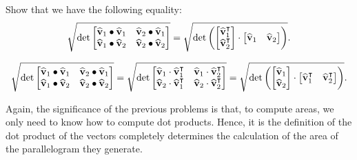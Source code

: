 \documentclass[newpage,hints,handout,nooutcomes,noauthor,12pt]{ximera}
\begin{document}
\begin{problem}
Show that we have the following equality:
\[
\sqrt{
  \det
\begin{bmatrix}
\hat{\mathbf v}_{1}\bullet\hat{\mathbf v}_{1} & \hat{\mathbf v}_{2}\bullet\hat{\mathbf v}_{1}\\
\hat{\mathbf v}_{1}\bullet\hat{\mathbf v}_{2} & \hat{\mathbf v}_{2}\bullet\hat{\mathbf v}_{2}%
\end{bmatrix}}
=
\sqrt{
  \det\left(
\begin{bmatrix}
\hat{\mathbf v}_{1}^\transpose \\
\hat{\mathbf v}_{2}^\transpose
\end{bmatrix}
\cdot
\begin{bmatrix}
\hat{\mathbf v}_{1}  & \hat{\mathbf v}_{2} 
\end{bmatrix}\right)}.
\]

\begin{freeResponse}
\[
\sqrt{
  \det
\begin{bmatrix}
\hat{\mathbf v}_{1}\bullet\hat{\mathbf v}_{1} & \hat{\mathbf v}_{2}\bullet\hat{\mathbf v}_{1}\\
\hat{\mathbf v}_{1}\bullet\hat{\mathbf v}_{2} & \hat{\mathbf v}_{2}\bullet\hat{\mathbf v}_{2}%
\end{bmatrix}}
=\sqrt{
  \det
\begin{bmatrix}
\hat{\mathbf v}_{1}\cdot \hat{\mathbf v}_{1}^\transpose & \hat{\mathbf v}_{1}\cdot \hat{\mathbf v}_{2}^\transpose\\
\hat{\mathbf v}_{2}\cdot \hat{\mathbf v}_{1}^\transpose & \hat{\mathbf v}_{2}\cdot \hat{\mathbf v}_{2}^\transpose%
\end{bmatrix}}
=\sqrt{
  \det\left(
\begin{bmatrix}
\hat{\mathbf v}_{1} \\
\hat{\mathbf v}_{2}
\end{bmatrix}
\cdot
\begin{bmatrix}
\hat{\mathbf v}_{1}^\transpose  & \hat{\mathbf v}_{2}^\transpose 
\end{bmatrix}\right)}.
\]
\end{freeResponse}
\end{problem}

Again, the significance of the previous problems is that, to compute
areas, we only need to know how to compute dot products. Hence, it is
the definition of the dot product of the vectors completely determines
the calculation of the area of the parallelogram they generate.
\end{document}
